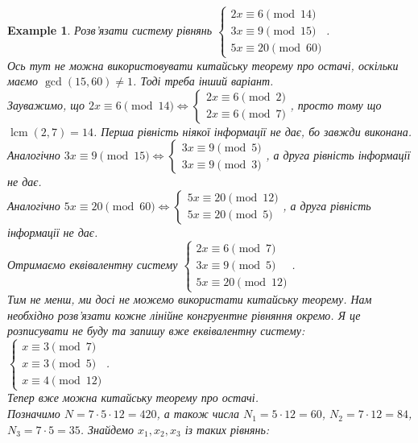 \documentclass[a4paper, 10pt]{article}
\theoremstyle{theoremdd}
\theoremstyle{theoremdd}
\theoremstyle{theoremdd}
\theoremstyle{theoremdd}
\newtheorem{example}[theorem]{Example}
\theoremstyle{theoremdd}
\theoremstyle{theoremdd}
\theoremstyle{theoremdd}
\theoremstyle{theoremdd}
\DeclareMathOperator{\lcm}{lcm}
\begin{document}
\begin{example}
Розв'язати систему рівнянь $\begin{cases} 2x \equiv 6 \pmod {14} \\ 3x \equiv 9 \pmod {15} \\ 5x \equiv 20 \pmod {60} \end{cases}$.\\
Ось тут не можна використовувати китайську теорему про остачі, оскільки маємо $\gcd(15,60) \neq 1$. Тоді треба інший варіант.\\
Зауважимо, що $2x \equiv 6 \pmod {14} \iff \begin{cases} 2x \equiv 6 \pmod 2 \\ 2x \equiv 6 \pmod 7 \end{cases}$, просто тому що $\lcm(2,7) = 14$. Перша рівність ніякої інформації не дає, бо завжди виконана.\\
Аналогічно $3x \equiv 9 \pmod {15} \iff \begin{cases} 3x \equiv 9 \pmod 5 \\ 3x \equiv 9 \pmod 3 \end{cases}$, а друга рівність інформації не дає.\\
Аналогічно $5x \equiv 20 \pmod {60} \iff \begin{cases} 5x \equiv 20 \pmod {12} \\ 5x \equiv 20 \pmod 5 \end{cases}$, а друга рівність інформації не дає.\\
Отримаємо еквівалентну систему $\begin{cases}
2x \equiv 6 \pmod 7 \\
3x \equiv 9 \pmod 5 \\
5x \equiv 20 \pmod {12}
\end{cases}$.\\
Тим не менш, ми досі не можемо використати китайську теорему. Нам необхідно розв'язати кожне лінійне конгруентне рівняння окремо. Я це розписувати не буду та запишу вже еквівалентну систему:\\
$\begin{cases}
x \equiv 3 \pmod 7 \\
x \equiv 3 \pmod 5 \\
x \equiv 4 \pmod {12}
\end{cases}$.\\
Тепер вже можна китайську теорему про остачі. \\
Позначимо $N = 7 \cdot 5 \cdot 12 = 420$, а також числа $N_1 = 5 \cdot 12 = 60$, $N_2 = 7 \cdot 12 = 84$, $N_3 = 7 \cdot 5 = 35$. Знайдемо $x_1,x_2,x_3$ із таких рівнянь:\\

\end{example}
\end{document}
